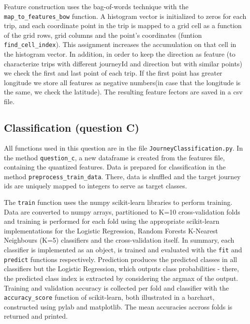 \documentclass[12pt]{article}
\begin{document}
  Feature construction uses the bag-of-words technique with the \texttt{map\_to\_features\_bow} function. A histogram vector is
  initialized to zeros for each trip, and each coordinate point in the trip is 
  mapped to a grid cell as a function of the grid rows, grid columns and the
  point's coordinates (funtion \texttt{find\_cell\_index}). This assignment increases the accumulation on that cell in the histogram vector. In addition, in order to keep the direction as feature (to characterize trips with different journeyId and direction but with similar points) we check the first and last point of each trip. If the first point has greater longitude we store all features as negative numbers(in case that the longitude is the same, we check the latitude). The resulting feature fectors are saved in a csv file.

	\subsection{Classification (question C)}
 All functions used in this question are in the file \texttt{JourneyClassification.py}. 
	In the method \texttt{question\_c}, a new dataframe is created from the
  features file, containing the quantized features.
  Data is prepared for classification in the method
  \texttt{preprocess\_train\_data}. There, data is shuffled and the target
  journey ids are uniquely mapped to integers to serve as target classes.

  The \texttt{train} function uses the numpy scikit-learn libraries to perform training.
  Data are converted to numpy arrays, partitioned to K=10 cross-validation folds
  and training is performed for each fold using the appropriate scikit-learn
  implementations for the Logistic Regression, Random Forests K-Nearest Neighbours (K=5)
  classifiers and the cross-validation itself. In summary, each classifier is
  implemented as an object, is trained and evaluated with the \texttt{fit} and
  \texttt{predict} functions respectively. Prediction produces the predicted
  classes in all classifiers but the Logistic Regression, which outputs class
  probabilities - there, the predicted class index is extracted by considering
  the argmax of the output. Training and validation accuracy
  is collected per fold and classifier with the \texttt{accuracy\_score} function
  of scikit-learn, both illustrated in a barchart, constructed using
  pylab and matplotlib. The mean accuracies accross folds is returned and printed.
  
\end{document}
